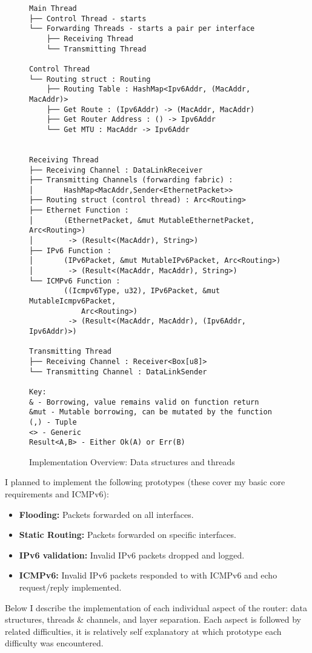 \documentclass[12pt,a4paper,twoside,openright]{report}
\begin{document}
\begin{figure}
\begin{lstlisting}[style=tree]
Main Thread
├── Control Thread - starts
└── Forwarding Threads - starts a pair per interface
    ├── Receiving Thread 
    └── Transmitting Thread

Control Thread
└── Routing struct : Routing
    ├── Routing Table : HashMap<Ipv6Addr, (MacAddr, MacAddr)>
    ├── Get Route : (Ipv6Addr) -> (MacAddr, MacAddr)
    ├── Get Router Address : () -> Ipv6Addr
    └── Get MTU : MacAddr -> Ipv6Addr
    

Receiving Thread
├── Receiving Channel : DataLinkReceiver
├── Transmitting Channels (forwarding fabric) : 
│       HashMap<MacAddr,Sender<EthernetPacket>>
├── Routing struct (control thread) : Arc<Routing>
├── Ethernet Function : 
│       (EthernetPacket, &mut MutableEthernetPacket, Arc<Routing>)
│        -> (Result<(MacAddr), String>)
├── IPv6 Function :
│       (IPv6Packet, &mut MutableIPv6Packet, Arc<Routing>)
│        -> (Result<(MacAddr, MacAddr), String>)
└── ICMPv6 Function :
        ((Icmpv6Type, u32), IPv6Packet, &mut MutableIcmpv6Packet, 
            Arc<Routing>) 
         -> (Result<(MacAddr, MacAddr), (Ipv6Addr, Ipv6Addr)>)

Transmitting Thread
├── Receiving Channel : Receiver<Box[u8]>
└── Transmitting Channel : DataLinkSender

Key:
& - Borrowing, value remains valid on function return
&mut - Mutable borrowing, can be mutated by the function
(,) - Tuple
<> - Generic
Result<A,B> - Either Ok(A) or Err(B)
\end{lstlisting}
\caption{Implementation Overview: Data structures and threads}
\label{fig::implementation_overview}
\end{figure}


\bigskip

I planned to implement the following prototypes (these cover my basic core requirements and ICMPv6):
\begin{itemize}
\item \textbf{Flooding:} Packets forwarded on all interfaces.
\item \textbf{Static Routing:} Packets forwarded on specific interfaces.
\item \textbf{IPv6 validation:} Invalid IPv6 packets dropped and logged.
\item \textbf{ICMPv6:} Invalid IPv6 packets responded to with ICMPv6 and echo request/reply implemented.
\end{itemize}
Below I describe the implementation of each individual aspect of the router: data structures, threads \& channels, and layer separation.  Each aspect is followed by related difficulties, it is relatively self explanatory at which prototype each difficulty was encountered.
\end{document}
